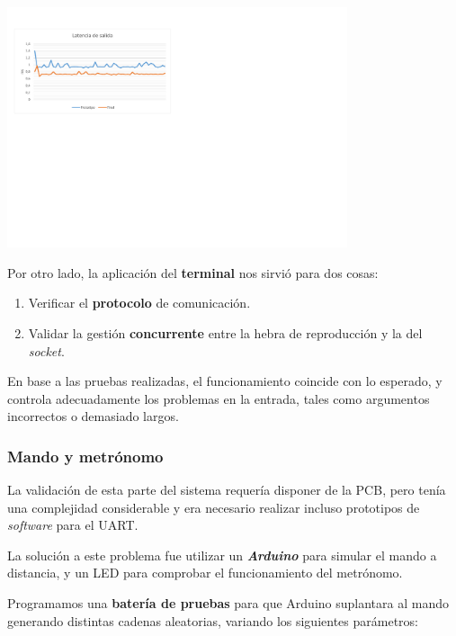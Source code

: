 \documentclass[10pt,a4paper]{article}
\begin{document}
	\begin{center}
		\includegraphics[width=0.75\textwidth]{images/lat_gpio} 
	\end{center}
	
	Por otro lado, la aplicación del \textbf{terminal} nos sirvió para dos cosas:
	
	\begin{enumerate}
		\item Verificar el \textbf{protocolo} de comunicación.
		\item Validar la gestión \textbf{concurrente} entre la hebra de reproducción y la del \textit{socket}.
	\end{enumerate}
	
	En base a las pruebas realizadas, el funcionamiento coincide con lo esperado, y controla adecuadamente los problemas en la entrada, tales como argumentos incorrectos o demasiado largos.
	
	\subsubsection*{Mando y metrónomo}
	
	La validación de esta parte del sistema requería disponer de la PCB, pero tenía una complejidad considerable y era necesario realizar incluso prototipos de \textit{software} para el UART.
	
	La solución a este problema fue utilizar un \textbf{\textit{Arduino}} para simular el mando a distancia, y un LED para comprobar el funcionamiento del metrónomo.
	
	Programamos una \textbf{batería de pruebas} para que Arduino suplantara al mando generando distintas cadenas aleatorias, variando los siguientes parámetros:
	
\end{document}
